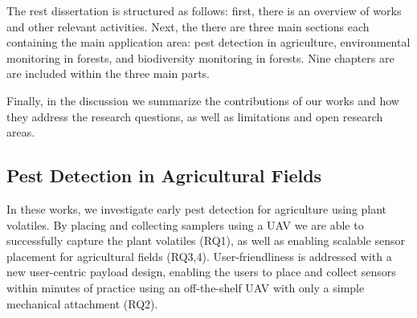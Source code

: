 The rest dissertation is structured as follows: first, there is an overview of works and other relevant activities. Next, the there are three main sections each containing the main application area: pest detection in agriculture, environmental monitoring in forests, and biodiversity monitoring in forests. Nine chapters are are included within the three main parts.

Finally, in the discussion we summarize the contributions of our works and how they address the research questions, as well as limitations and open research areas. %


\subsection{Pest Detection in Agricultural Fields}
In these works, we investigate early pest detection for agriculture using plant volatiles. By placing and collecting samplers using a UAV we are able to successfully capture the plant volatiles (RQ1), as well as enabling scalable sensor placement for agricultural fields (RQ3,4). User-friendliness is addressed with a new user-centric payload design, enabling the users to place and collect sensors within minutes of practice using an off-the-shelf UAV with only a simple mechanical attachment (RQ2).


